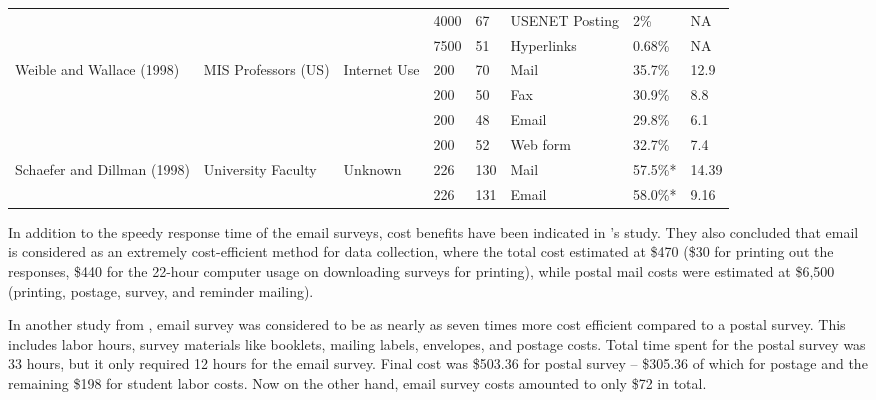\begin{center}
\begin{longtable}{ | p{2cm} | p{2cm} | p{2cm} | p{0.75cm} | p{0.75cm} | p{1cm} | p{1cm} | p{0.5cm} | }
	&  &  & 4000 & 67 & USENET Posting & 2\% & NA \\ \cline{4-8}
	&  &  & 7500 & 51 & Hyperlinks & 0.68\% & NA \\ \hline 
    \multirow{4}{2cm}{Weible and Wallace (1998)} & \multirow{4}{2cm}{MIS Professors (US)} & \multirow{4}{2cm}{Internet Use} & 200 & 70 & Mail & 35.7\% & 12.9 \\ \cline{4-8}
	&  &  & 200 & 50 & Fax & 30.9\% & 8.8 \\ \cline{4-8}
	&  &  & 200 & 48 & Email & 29.8\% & 6.1 \\ \cline{4-8}
	&  &  & 200 & 52 & Web form & 32.7\% & 7.4 \\ \hline
    \multirow{2}{2cm}{Schaefer and Dillman (1998)} & \multirow{2}{2cm}{University Faculty} & \multirow{2}{2cm}{Unknown} & 226 & 130 & Mail & 57.5\%* & 14.39 \\ \cline{4-8}
	&  &  & 226 & 131 & Email & 58.0\%* & 9.16 \\ \hline
    \end{longtable}
\end{center}


In addition to the speedy response time of the email surveys, cost benefits have been indicated in \citeauthor{Sheehan2006}'s \citeyearpar{Sheehan2006} study. They also concluded that email is considered as an extremely cost-efficient method for data collection, where the total cost estimated at \$470 (\$30 for printing out the responses, \$440 for the 22-hour computer usage on downloading surveys for printing), while postal mail costs were estimated at \$6,500 (printing, postage, survey, and reminder mailing).
\vspace{1cm}

In another study from \cite{Mavis1998}, email survey was considered to be as nearly as seven times more cost efficient compared to a postal survey. This includes labor hours, survey materials like booklets, mailing labels, envelopes, and postage costs. Total time spent for the postal survey was 33 hours, but it only required 12 hours for the email survey. Final cost was \$503.36 for postal survey -- \$305.36 of which for postage and the remaining \$198 for student labor costs. Now on the other hand, email survey costs amounted to only \$72 in total.
\vspace{1cm}

